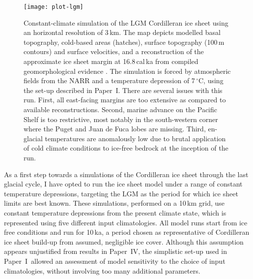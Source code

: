 \documentclass[a4paper]{kappa}
\newcommand{\unit}[1]{\ensuremath{\mathrm{#1}}}
\newcommand{\degree}[0]{\ensuremath{^{\circ}}}
\newcommand{\degC}[0]{\unit{{\degree}C}}
\newcommand{\CCLI}[0]{Paper~I}      %
\newcommand{\CCYC}[0]{Paper~IV}     %
\begin{document}
\begin{figure}
  \begin{minipage}[t]{112.5mm}\vspace{0pt}
    \texttt{[image: plot-lgm]}
  \end{minipage}%
  \hspace{1cm}%
  \begin{minipage}[t]{47.5mm}\vspace{-12pt}  %
    \caption{Constant-climate simulation of the LGM Cordilleran ice sheet using
             an horizontal resolution of 3\,km. The map depicts modelled basal
             topography, cold-based areas (hatches), surface topography (100\,m
             contours) and surface velocities, and a reconstruction of the
             approximate ice sheet margin at 16.8\,cal\,ka from compiled
             geomorphological evidence \citep[red contour;][]{Dyke.2004}.
             The simulation is forced by atmospheric
             fields from the NARR \citep{Mesinger.etal.2006} and a temperature
             depression of 7\,\degC, using the set-up described in \CCLI. There
             are several issues with this run. First, all east-facing margins
             are too extensive as compared to available reconstructions.
             Second, marine advance on the Pacific Shelf is too restrictive,
             most notably in the south-western corner where the Puget and Juan
             de Fuca lobes are missing. Third, en-glacial temperatures are
             anomalously low due to brutal application of cold climate
             conditions to ice-free bedrock at the inception of the run.}
    \label{fig:plot-lgm}
  \end{minipage}
\end{figure}

As a first step towards a simulations of the Cordilleran ice sheet through the
last glacial cycle, I have opted to run the ice sheet model under a range of
constant temperature depressions, targeting the LGM as the period for which ice
sheet limits are best known. These simulations,
performed on a 10\,km grid, use constant temperature depressions
from the present climate state, which is represented using five different input
climatologies. All model runs start
from ice free conditions and run for 10\,ka, a period chosen as representative
of Cordilleran ice sheet build-up from assumed, negligible ice cover. Although
this assumption appears unjustified from results in \CCYC, the simplistic
set-up used in \CCLI\ allowed an assessment of model sensitivity to the choice
of input climatologies, without involving too many additional parameters.
\end{document}
